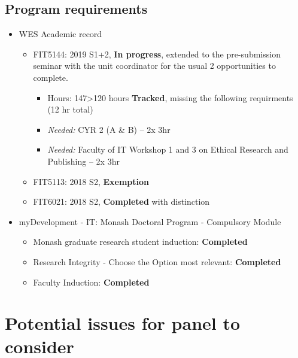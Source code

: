 \documentclass[
  11,
]{article}
\providecommand{\tightlist}{%
  \setlength{\itemsep}{0pt}\setlength{\parskip}{0pt}}
\begin{document}
\hypertarget{program-requirements}{%
\subsection{Program requirements}\label{program-requirements}}

\begin{itemize}
\tightlist
\item
  WES Academic record

  \begin{itemize}
  \tightlist
  \item
    FIT5144: 2019 S1+2, \textbf{In progress}, extended to the pre-submission seminar with the unit coordinator for the usual 2 opportunities to complete.

    \begin{itemize}
    \tightlist
    \item
      Hours: 147\textgreater120 hours \textbf{Tracked}, missing the following requirments (12 hr total)
    \item
      \emph{Needed:} CYR 2 (A \& B) -- 2x 3hr
    \item
      \emph{Needed:} Faculty of IT Workshop 1 and 3 on Ethical Research and Publishing -- 2x 3hr
    \end{itemize}
  \item
    FIT5113: 2018 S2, \textbf{Exemption}
  \item
    FIT6021: 2018 S2, \textbf{Completed} with distinction
  \end{itemize}
\item
  myDevelopment - IT: Monash Doctoral Program - Compulsory Module

  \begin{itemize}
  \tightlist
  \item
    Monash graduate research student induction: \textbf{Completed}
  \item
    Research Integrity - Choose the Option most relevant: \textbf{Completed}
  \item
    Faculty Induction: \textbf{Completed}
  \end{itemize}
\end{itemize}

\hypertarget{potential-issues-for-panel-to-consider}{%
\section{Potential issues for panel to consider}\label{potential-issues-for-panel-to-consider}}
\end{document}
